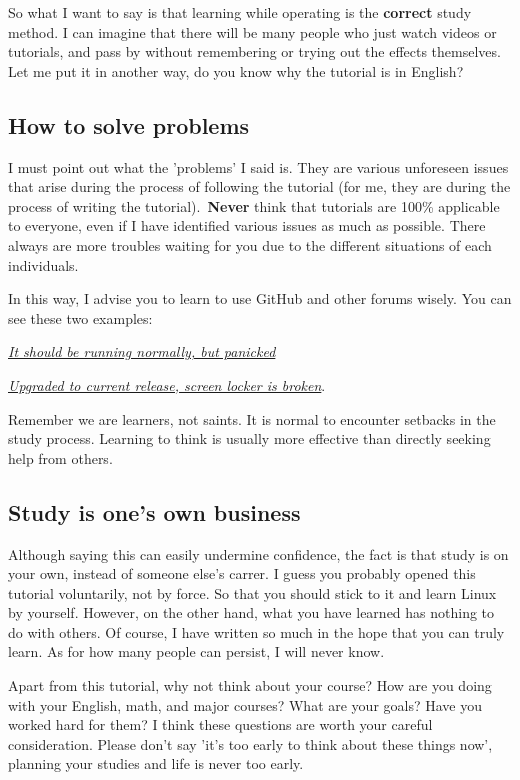 \documentclass[lang=en,color=blue,12pt]{elegantbook}
\begin{document}
So what I want to say is that learning while operating is the
\textbf{correct} study method. I can imagine that there will be many
people who just watch videos or tutorials, and pass by without
remembering or trying out the effects themselves. Let me put it in
another way, do you know why the tutorial is in English?

\subsection*{How to solve problems}

I must point out what the 'problems' I said is. They are various unforeseen
issues that arise during the process of following the tutorial (for me, they
are during the process of writing the tutorial).\ \textbf{Never} think that
tutorials are 100\% applicable to everyone, even if I have identified various
issues as much as possible. There always are more troubles waiting for you due
to the different situations of each individuals.

In this way, I advise you to learn to use GitHub and other forums
wisely. You can see these two examples:

\href{https://github.com/iffse/pay-respects/issues/34}{\textit{It should be
running normally, but panicked}}

\href{https://www.reddit.com/r/kde/comments/zlr6hb/upgraded_to_current_release_screen_locker_is/}{\textit{Upgraded
to current release, screen locker is broken}}.

Remember we are learners, not saints. It is normal to encounter
setbacks in the study process. Learning to think is usually more
effective than directly seeking help from others.

\subsection*{Study is one's own business}

Although saying this can easily undermine confidence, the fact is that
study is on your own, instead of someone else's carrer. I guess you probably
opened this tutorial voluntarily, not by force. So that you should stick to
it and learn Linux by yourself. However, on the other hand, what you have
learned has nothing to do with others. Of course, I have written so much in
the hope that you can truly learn. As for how many people can persist, I will
never know.

Apart from this tutorial, why not think about your course? How are you
doing with your English, math, and major courses? What are your goals?
Have you worked hard for them? I think these questions are worth your
careful consideration. Please don't say 'it's too early to think about these
things now', planning your studies and life is never too early.
\end{document}
